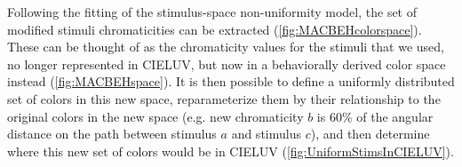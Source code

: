 Following the fitting of the stimulus-space non-uniformity model, the set of modified stimuli chromaticities can be extracted (\autoref{fig:MACBEHcolorspace}). 
These can be thought of as the chromaticity values for the stimuli that we used, no longer represented in CIELUV, but now in a behaviorally derived color space instead (\autoref{fig:MACBEHspace}). 
It is then possible to define a uniformly distributed set of colors in this new space, reparameterize them by their relationship to the original colors in the new space (e.g. new chromaticity $b$ is 60\% of the angular distance on the path between stimulus $a$ and stimulus $c$), and then determine where this new set of colors would be in CIELUV (\autoref{fig:UniformStimsInCIELUV}).